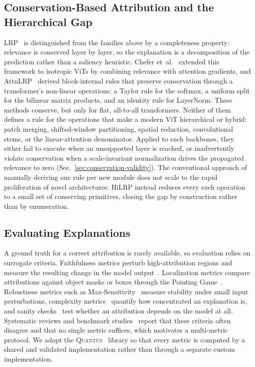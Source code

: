 \documentclass[lettersize,journal]{IEEEtran}
\theoremstyle{definition}
\theoremstyle{plain}
\begin{document}
\subsection{Conservation-Based Attribution and the Hierarchical Gap}
\label{sec:related-lrp} 
LRP~\cite{bach2015lrp} is distinguished from the families above by a completeness property: relevance is conserved layer by layer, so the explanation is a decomposition of the prediction rather than a saliency heuristic. Chefer et~al.~\cite{chefer2021transformer} extended this framework to isotropic ViTs by combining relevance with attention gradients, and AttnLRP~\cite{achtibat2024attnlrp} derived block-internal rules that preserve conservation through a transformer's non-linear operations: a Taylor rule for the softmax, a uniform split for the bilinear matrix products, and an identity rule for LayerNorm. These methods conserve, but only for flat, all-to-all transformers. Neither of them defines a rule for the operations that make a modern ViT hierarchical or hybrid: patch merging, shifted-window partitioning, spatial reduction, convolutional stems, or the linear-attention denominator. Applied to such backbones, they either fail to execute when an unsupported layer is reached, or inadvertently violate conservation when a scale-invariant normalization drives the propagated relevance to zero (Sec.~\ref{sec:conservation-validity}). The conventional approach of manually deriving one rule per new module does not scale to the rapid proliferation of novel architectures. HiLRP instead reduces every such operation to a small set of conserving primitives, closing the gap by construction rather than by enumeration.

\subsection{Evaluating Explanations}
A ground truth for a correct attribution is rarely available, so evaluation relies on surrogate criteria. Faithfulness metrics perturb high-attribution regions and measure the resulting change in the model output~\cite{bhatt2020faithfulness,alvarez2018robustness,rong2022road}. Localization metrics compare attributions against object masks or boxes through the Pointing Game~\cite{zhang2018pointing}. Robustness metrics such as Max-Sensitivity~\cite{yeh2019sensitivity} measure stability under small input perturbations, complexity metrics~\cite{chalasani2020sparseness} quantify how concentrated an explanation is, and sanity checks~\cite{adebayo2018sanity} test whether an attribution depends on the model at all. Systematic reviews and benchmark studies~\cite{nauta2023anecdotal,bodria2023benchmarking} report that these criteria often disagree and that no single metric suffices, which motivates a multi-metric protocol. We adopt the \textsc{Quantus}~\cite{hedstrom2023quantus} library so that every metric is computed by a shared and validated implementation rather than through a separate custom implementation.
\end{document}
